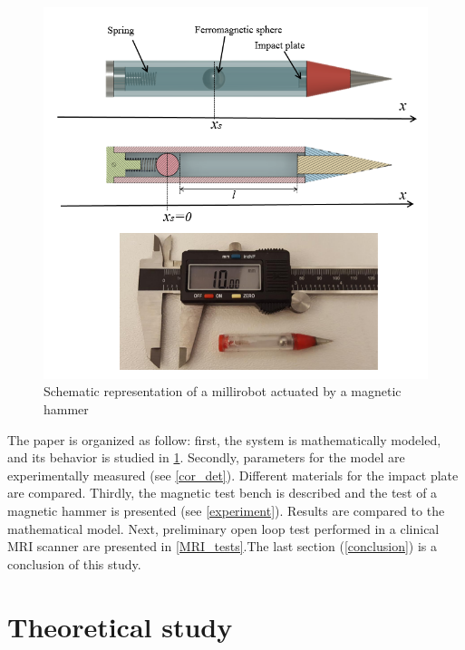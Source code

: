 \documentclass[letterpaper, 10 pt, conference]{ieeeconf}  %
\begin{document}
\begin{figure}
  \includegraphics[width=\linewidth]{figure1-2.png}
  \caption{Schematic representation of a millirobot actuated by a magnetic hammer}
  \label{millirobot}
\end{figure}

The paper is organized as follow: first, the system is mathematically modeled, and its behavior is studied in \cref{theoretical}. Secondly, parameters for the model are experimentally measured (see \cref{cor_det}). Different materials for the impact plate are compared. Thirdly, the magnetic test bench is described and the test of a magnetic hammer is presented (see \cref{experiment}). Results are compared to the mathematical model. Next, preliminary open loop test performed in a clinical MRI scanner are presented in \cref{MRI_tests}.The last section (\cref{conclusion}) is a conclusion of this study.


\section{Theoretical study}
\label{theoretical}
\end{document}
